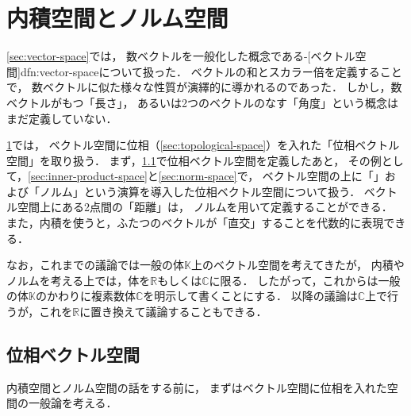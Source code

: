 \documentclass[../sotsu.tex]{subfiles}
\begin{document}
\section{内積空間とノルム空間}
\label{sec:inner-product-and-norm}

\cref{sec:vector-space}では，
数ベクトルを一般化した概念である-[ベクトル空間]{dfn:vector-space}について扱った．
ベクトルの和とスカラー倍を定義することで，
数ベクトルに似た様々な性質が演繹的に導かれるのであった．
しかし，数ベクトルがもつ「長さ」，
あるいは2つのベクトルのなす「角度」という概念はまだ定義していない．

\cref{sec:inner-product-and-norm}では，
ベクトル空間に位相（\cref{sec:topological-space}）を入れた「位相ベクトル空間」を取り扱う．
まず，\cref{sec:topological-vector-space}で位相ベクトル空間を定義したあと，
その例として，\cref{sec:inner-product-space}と\cref{sec:norm-space}で，
ベクトル空間の上に「」および「ノルム」という演算を導入した位相ベクトル空間について扱う．
ベクトル空間上にある2点間の「距離」は，
ノルムを用いて定義することができる．
また，内積を使うと，ふたつのベクトルが「直交」することを代数的に表現できる．

なお，これまでの議論では一般の体$𝕂$上のベクトル空間を考えてきたが，
内積やノルムを考える上では，体を$ℝ$もしくは$ℂ$に限る．
したがって，これからは一般の体$𝕂$のかわりに複素数体$ℂ$を明示して書くことにする．
以降の議論は$ℂ$上で行うが，これを$ℝ$に置き換えて議論することもできる．



\subsection{位相ベクトル空間}
\label{sec:topological-vector-space}

内積空間とノルム空間の話をする前に，
まずはベクトル空間に位相を入れた空間の一般論を考える．
\end{document}
